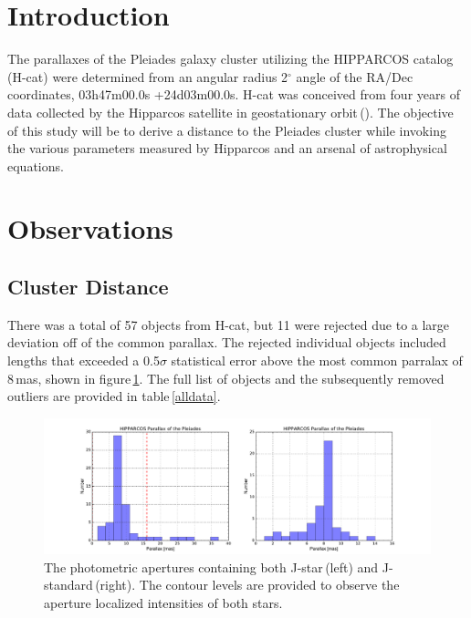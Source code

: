 \documentclass[onecolumn]{aastex6}
\begin{document}



\section{Introduction}

The parallaxes of the Pleiades galaxy cluster utilizing the HIPPARCOS catalog\,(H-cat) were determined from an angular radius 2$^\circ$ angle of the RA/Dec coordinates, 03h47m00.0s +24d03m00.0s. H-cat was conceived from four years of data collected by the Hipparcos satellite in geostationary orbit\,(\cite{1}). The objective of this study will be to derive a distance to the Pleiades cluster while invoking the various parameters measured by Hipparcos and an arsenal of astrophysical equations.


\section{Observations}

\subsection{Cluster Distance}
There was a total of 57 objects from H-cat, but 11 were rejected due to a large deviation off of the common parallax. The rejected individual objects included lengths that exceeded a 0.5$\sigma$ statistical error above the most common parralax of 8\,mas, shown in figure\,\ref{Parallaxes}. The full list of objects and the subsequently removed outliers are provided in table\,\ref{alldata}.

\begin{figure}[ht]
  \centering
  \includegraphics[scale=0.4]{parallax(1).pdf}%
  \caption{The photometric apertures containing both J-star\,(left) and J-standard\,(right). The contour levels are provided to observe the aperture localized intensities of both stars.}
  \label{Parallaxes}
\end{figure}
\end{document}
